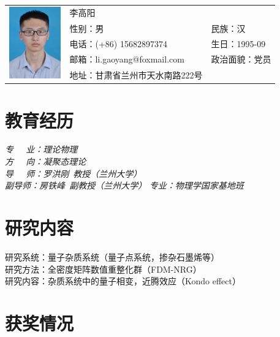 \documentclass{resume}
\begin{document}

\Large{
  \begin{tabu}{ c l l }
    &
   \scshape{李高阳} &  \\
    & 性别：男 & 民族：汉 \\
    & 电话：(+86) 15682897374 & 生日：1995-09 \\
    & 邮箱：li.gaoyang@foxmail.com & 政治面貌：党员\\
    & 地址：甘肃省兰州市天水南路222号 \hspace{40} & %
  \end{tabu}
}

\section{教育经历}
\textit{专$\quad\ \ $业：理论物理}\\
\textit{方$\quad\ \ $向：凝聚态理论}\\
\textit{导$\quad\ \ $师：罗洪刚\ 教授（兰州大学）}\\
\textit{副\hspace{7\ccwd}导\hspace{7\ccwd}师：房铁峰\ 副教授（兰州大学）}
\textit{专业：物理学国家基地班}

\section{研究内容}
研究系统：量子杂质系统（量子点系统，掺杂石墨烯等）\\
研究方法：全密度矩阵数值重整化群（FDM-NRG）\\
研究内容：杂质系统中的量子相变，近腾效应（Kondo effect）\\

\section{获奖情况}
\end{document}
